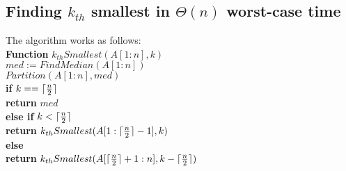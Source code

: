 \documentclass[11pt]{article}
\DeclarePairedDelimiter\ceil{\lceil}{\rceil}
\begin{document}
\subsection{Finding $k_{th}$ smallest in $\Theta(n)$ worst-case time}

The algorithm works as follows:\\

\textbf{Function} $k_{th}Smallest(A[1:n], k)$\\
\-\hspace{3em} $med := FindMedian(A[1:n])$\\
\-\hspace{3em} $Partition(A[1:n], med)$\\
\-\hspace{3em} \textbf{if} $k == \ceil{\frac{n}{2}}$\\
\-\hspace{5em} \textbf{return} $med$\\
\-\hspace{3em} \textbf{else if} $k < \ceil{\frac{n}{2}}$\\
\-\hspace{5em} \textbf{return}
$k_{th}Smallest(A[1:\ceil{\frac{n}{2}}-1], k)$\\
\-\hspace{3em} \textbf{else}\\
\-\hspace{5em} \textbf{return}
$k_{th}Smallest(A[\ceil{\frac{n}{2}}+1:n], k-\ceil{\frac{n}{2}})$\\
\end{document}
